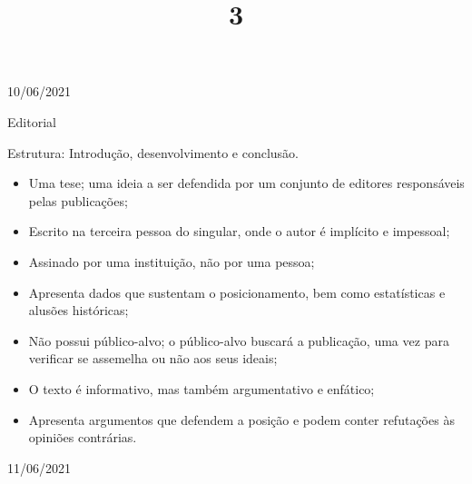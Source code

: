 \documentclass{SchoolBook}
\begin{document}
    \begin{day}{10/06/2021}
        \title{3}{Editorial}
        
        Estrutura: Introdução, desenvolvimento e conclusão.
        
        \begin{itemize}[nosep]
            \item Uma tese; uma ideia a ser defendida por um conjunto de editores responsáveis pelas publicações;
            \item Escrito na terceira pessoa do singular, onde o autor é implícito e impessoal;
            \item Assinado por uma instituição, não por uma pessoa;
            \item Apresenta dados que sustentam o posicionamento, bem como estatísticas e alusões históricas;
            \vspace{6pt}
            \item Não possui público-alvo; o público-alvo buscará a publicação, uma vez para verificar se assemelha ou não aos seus ideais;
            \item O texto é informativo, mas também argumentativo e enfático;
            \item Apresenta argumentos que defendem a posição e podem conter refutações às opiniões contrárias.
        \end{itemize}
    \end{day}
    
    \begin{day}{11/06/2021}
        
    \end{day}
\end{document}
